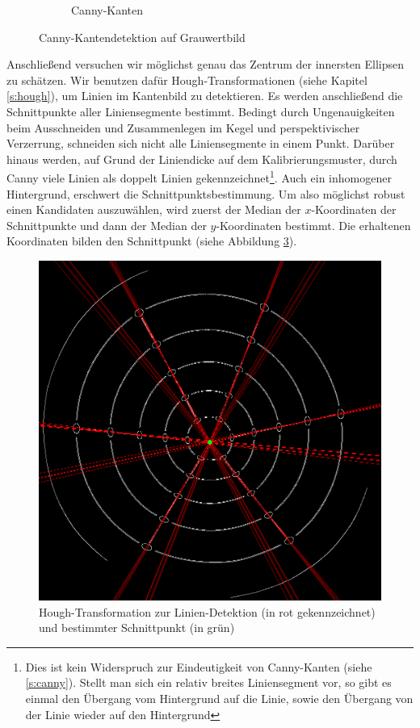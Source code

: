 \begin{figure}[!htb]
\begin{subfigure}{.5\textwidth}
		\caption{Canny-Kanten}
		\label{fig:afterCanny}
	\end{subfigure}
	\caption{Canny-Kantendetektion auf Grauwertbild}
	\label{fig:canny}
\end{figure}

Anschließend versuchen wir möglichst genau das Zentrum der innersten Ellipsen zu schätzen.
Wir benutzen dafür Hough-Transformationen (siehe Kapitel \ref{s:hough}), um Linien im Kantenbild zu detektieren.
Es werden anschließend die Schnittpunkte aller Liniensegmente bestimmt. Bedingt durch Ungenauigkeiten beim Ausschneiden und Zusammenlegen im Kegel und perspektivischer Verzerrung, schneiden sich nicht alle Liniensegmente in einem Punkt.
Darüber hinaus werden, auf Grund der Liniendicke auf dem Kalibrierungsmuster, durch Canny viele Linien als doppelt Linien gekennzeichnet\footnote{Dies ist kein Widerspruch zur Eindeutigkeit von Canny-Kanten (siehe \ref{s:canny}). Stellt man sich ein relativ breites Liniensegment vor, so gibt es einmal den Übergang vom Hintergrund auf die Linie, sowie den Übergang von der Linie wieder auf den Hintergrund}. Auch ein inhomogener Hintergrund, erschwert die Schnittpunktsbestimmung. Um also möglichst robust einen Kandidaten auszuwählen, wird zuerst der Median der $x$-Koordinaten der Schnittpunkte und dann der Median der $y$-Koordinaten bestimmt. Die erhaltenen Koordinaten bilden den Schnittpunkt (siehe Abbildung \ref{fig:houghLines}).

\begin{figure}[!htb]
	\centering
	\includegraphics[scale=.25]{images/houghLines.png}
	\caption{Hough-Transformation zur Linien-Detektion (in rot gekennzeichnet) und bestimmter Schnittpunkt (in grün) }
	\label{fig:houghLines}
\end{figure}

